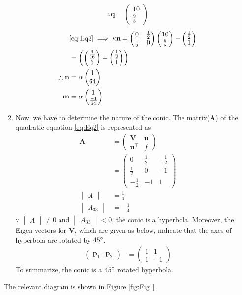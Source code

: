\documentclass[12pt]{article}
\newcommand{\mydet}[1]{\ensuremath{\begin{vmatrix}#1\end{vmatrix}}}
\providecommand{\brak}[1]{\ensuremath{\left(#1\right)}}
\newcommand{\myvec}[1]{\ensuremath{\begin{pmatrix}#1\end{pmatrix}}}
\let\vec\mathbf
\begin{document}
\begin{enumerate}
\begin{enumerate}
\begin{align}
	 \therefore \vec{q} = \myvec{10 \\ \frac{9}{8}}
\end{align}
\begin{align}
	& \eqref{eq:Eq3} \implies  \kappa \vec{n} = \myvec{ 0 & \frac{1}{2} \\ \frac{1}{2} & 0} \myvec{10 \\ \frac{9}{8}}-\myvec{\frac{1}{2} \\ 1} \\  
	&= \brak{\myvec{ \frac{9}{16} \\ 5} - \myvec{\frac{1}{2} \\ 1}} \\
	\therefore \vec{n} &= \alpha\myvec{1 \\ 64}\\
	\vec{m} &= \alpha\myvec{1 \\ \frac{-1}{64}}
\end{align}
\item Now, we have to determine the nature of the conic. The matrix($\vec{A}$) of the quadratic equation \eqref{eq:Eq2} is represented as
\begin{align}
         \vec{A} &= \myvec{\vec{V} & \vec{u} \\ \vec{u}^\top & f} \\
	 &= \myvec{0 & \frac{1}{2} & -\frac{1}{2} \\ 
	           \frac{1}{2} & 0 & -1   \\
		   -\frac{1}{2} & -1 & 1}  \\
	\mydet{A} &=  \frac{1}{4} \\ 
	\mydet{A_{33}} &= -\frac{1}{4} 
\end{align}
$\because$ $\mydet{A} \neq 0$ and $\mydet{A_{33}} < 0$, the conic is a hyperbola. Moreover, the Eigen vectors for $\vec{V}$, which are given as below, indicate that the axes of hyperbola are rotated by $45\degree$. 
\begin{align}
	\myvec{\vec{p}_1 & \vec{p}_2} &= \myvec{1 & 1 \\ 1 & -1}
\end{align}
To summarize, the conic is a $45\degree$ rotated hyperbola.
\end{enumerate}
The relevant diagram is shown in Figure \ref{fig:Fig1}
\begin{figure}[!h]
	\begin{center}

\end{center}
\end{figure}
\end{enumerate}
\end{document}

